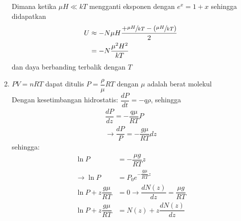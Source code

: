 \begin{enumerate}
    Dimana ketika $\mu H\ll kT$ mengganti eksponen dengan $e^x=1+x$ sehingga didapatkan
    \begin{equation*}
        \begin{split}
            U&\approx-N\mu H\dfrac{+\sfrac{\mu H}{kT}-\left(\sfrac{\mu H}{kT}\right)}{2}\\
            &=-N\dfrac{\mu^2H^2}{kT}
        \end{split}
    \end{equation*}
    dan daya berbanding terbalik dengan $T$
    \item $PV=nRT$ dapat ditulis $P=\dfrac{\rho}{\mu}RT$ dengan $\mu$ adalah berat molekul\\
    Dengan kesetimbangan hidrostatis: $\dfrac{dP}{dt}=-q\rho$, sehingga
    \begin{equation*}
        \begin{split}
            \dfrac{dP}{dz}=-\dfrac{q\mu}{RT}P\\
            \rightarrow \dfrac{dP}{P}=-\dfrac{g\mu}{RT}dz
        \end{split}
    \end{equation*}
    sehingga:
    \begin{equation*}
        \begin{split}
            \ln P&=-\dfrac{\mu g}{RT}z\\
            \rightarrow \ln P&=P_0 e^{-\dfrac{g\mu}{RT}z}\\
            \ln P+z\dfrac{g\mu}{RT}&=0\rightarrow \dfrac{dN(z)}{dz}=\dfrac{\mu g}{RT}\\
            \ln P+z\dfrac{g\mu}{RT}&=N(z)+z\dfrac{dN(z)}{dz}
        \end{split}
    \end{equation*}
\end{enumerate}